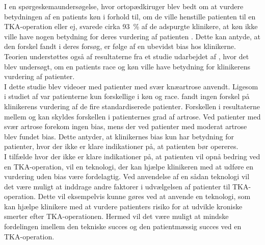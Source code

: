I en spørgeskemaundersøgelse, hvor ortopædkiruger blev bedt om at vurdere betydningen af en patients køn i forhold til, om de ville henstille patienten til en TKA-operation eller ej, svarede cirka 93~\% af de adspurgte klinikere, at køn ikke ville have nogen betydning for deres vurdering af patienten \citep{wright1995}. Dette kan antyde, at den forskel  fandt i deres forsøg, er følge af en ubevidst bias hos klinikerne. Teorien understøttes også af resultaterne fra et studie udarbejdet af , hvor det blev undersøgt, om en patients race og køn ville have betydning for klinikerens vurdering af patienter.\\
I dette studie blev videoer med patienter med svær knæartrose anvendt. Ligesom i studiet af  var patienterne kun forskellige i køn og race.  fandt ingen forskel på klinikerens vurdering af de fire standardiserede patienter. Forskellen i resultaterne mellem  og  kan skyldes forskellen i patienternes grad af artrose. Ved patienter med svær artrose forekom ingen bias, mens der ved patienter med moderat artrose blev fundet bias. Dette antyder, at klinikernes bias kun har betydning for patienter, hvor der ikke er klare indikationer på, at patienten bør opereres.\\
I tilfælde hvor der ikke er klare indikationer på, at patienten vil opnå bedring ved en TKA-operation, vil en teknologi, der kan hjælpe klinikeren med at udføre en vurdering uden bias være fordelagtig. Ved anvendelse af en sådan teknologi vil det være muligt at inddrage andre faktorer i udvælgelsen af patienter til TKA-operation. Dette vil eksempelvis kunne gøres ved at anvende en teknologi, som kan hjælpe klinikere med at vurdere patienters risiko for at udvikle kroniske smerter efter TKA-operationen. Hermed vil det være muligt at mindske fordelingen imellem den tekniske succes og den patientmæssig succes ved en TKA-operation.

